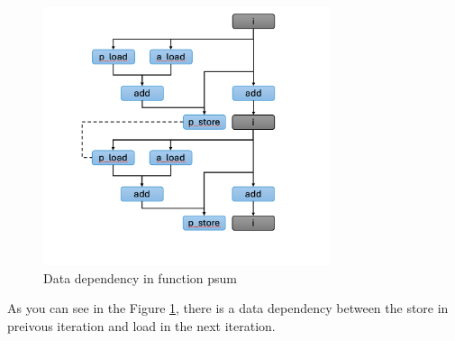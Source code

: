 \documentclass{article}
\begin{document}
\begin{figure}[h]
	\centering
	\includegraphics[width=0.75\textwidth]{fig1}
	\caption{Data dependency in function psum}
	\label{fig:fig1}
\end{figure}
	As you can see in the Figure \ref{fig:fig1}, there is a data dependency between
	the store in preivous iteration and load in the next iteration.
\end{document}
